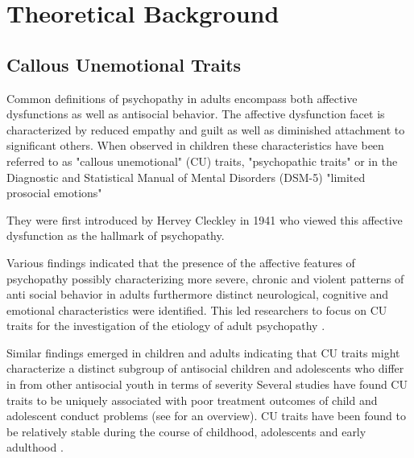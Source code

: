 


\section{Theoretical Background}
\subsection{Callous Unemotional Traits}
Common definitions of psychopathy in adults encompass both affective dysfunctions as well as antisocial behavior.
The affective dysfunction facet is characterized by reduced empathy and guilt as well as diminished attachment to significant others.
When observed in children these characteristics have been referred to as "callous unemotional" (CU) traits, "psychopathic traits" or in the Diagnostic and Statistical Manual of Mental Disorders (DSM-5)
"limited prosocial emotions" \parencite{viding_callousunemotional_2018}

They were first introduced by Hervey Cleckley in 1941 who viewed this affective dysfunction as the hallmark of psychopathy.

Various findings indicated that the presence of the affective features of psychopathy possibly characterizing more severe,
chronic and violent patterns of anti social behavior in adults \parencite{leistico_large-scale_2008} furthermore distinct neurological, cognitive and emotional characteristics \parencite{blair_neurobiology_2013, frick_psychopathy_2018} were identified.
This led researchers to focus on CU traits for the investigation of the etiology of adult psychopathy \parencite{frick_evaluating_2015}.

Similar findings emerged in children and adults indicating that CU traits might characterize a distinct subgroup of antisocial children and adolescents
who differ in from other antisocial youth in terms of severity 
Several studies have found CU traits to be uniquely associated with poor treatment outcomes of child and adolescent conduct problems (see \cite{hawes_callous-unemotional_2014} for an overview).
CU traits have been found to be relatively stable during the course of childhood, adolescents and early adulthood \parencite{obradovic_measuring_2007, loney_adolescent_2007}.

